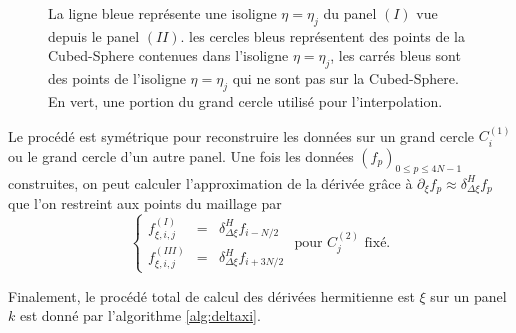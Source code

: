 \begin{figure}[htbp]
\begin{center}
\end{center}
\caption{La ligne bleue représente une isoligne $\eta=\eta_j$ du panel $(I)$ vue depuis le panel $(II)$. les cercles bleus représentent des points de la Cubed-Sphere contenues dans l'isoligne $\eta=\eta_j$, les carrés bleus sont des points de l'isoligne $\eta=\eta_j$ qui ne sont pas sur la Cubed-Sphere. En vert, une portion du grand cercle utilisé pour l'interpolation.}
\label{fig: panel II_interp2}
\end{figure}  

Le procédé est symétrique pour reconstruire les données sur un grand cercle $C_i^{(1)}$ ou le grand cercle d'un autre panel.
Une fois les données $(f_p)_{0 \leq p \leq 4N-1}$ construites, on peut calculer l'approximation de la dérivée grâce à $\partial_{\xi} f_p \approx \delta_{\Delta \xi}^H f_p$
que l'on restreint aux points du maillage par 
\begin{equation}
\left\lbrace
\begin{array}{rcl}
f_{\xi,i,j}^{(I)} & = & \delta_{\Delta \xi}^H f_{i-N/2}\\
f_{\xi,i,j}^{(III)} & = & \delta_{\Delta \xi}^H f_{i+3N/2}
\end{array}
\right.
\text{ pour } C^{(2)}_j \text{ fixé.}
\end{equation}

Finalement, le procédé total de calcul des dérivées hermitienne est $\xi$ sur un panel $k$ est donné par l'algorithme \ref{alg:deltaxi}.

